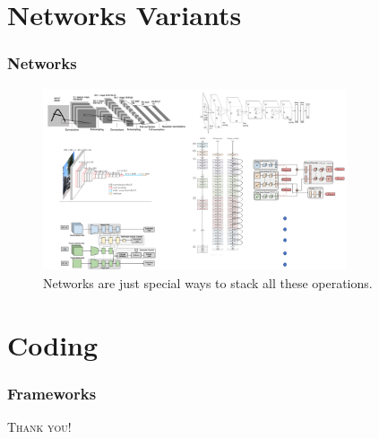 \documentclass[10pt]{beamer}
\begin{document}
\section{Networks Variants}
\begin{frame}
\frametitle{Networks}
	\begin{figure}[H]
	\centerline{
		\includegraphics[width=0.8\textwidth]{networks.png}
	}
	\caption{Networks are just special ways to stack all these operations.}
\end{figure}
\end{frame}

\section{Coding}
\begin{frame}
\frametitle{Frameworks}
\end{frame}

\begin{frame}
	\begin{center}
		{\textcolor[rgb]{1 0 0}{\Huge\textsc{Thank you!}}}\bigskip
	\end{center}
\end{frame}
\end{document}
